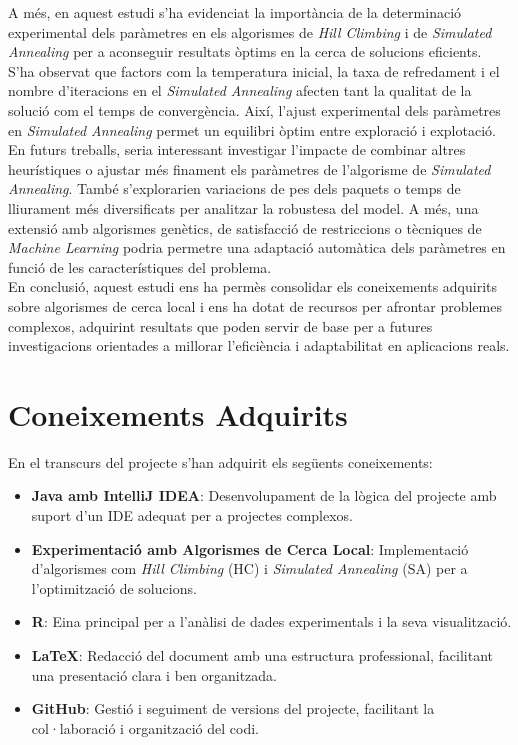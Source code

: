 \documentclass[a4paper]{article}
\begin{document}
	A més, en aquest estudi s'ha evidenciat la importància de la determinació experimental dels paràmetres en els algorismes de \textit{Hill Climbing} i de \textit{Simulated Annealing} per a aconseguir resultats òptims en la cerca de solucions eficients. S'ha observat que factors com la temperatura inicial, la taxa de refredament i el nombre d'iteracions en el \textit{Simulated Annealing} afecten tant la qualitat de la solució com el temps de convergència. Així, l'ajust experimental dels paràmetres en \textit{Simulated Annealing} permet un equilibri òptim entre exploració i explotació. \\
	
	En futurs treballs, seria interessant investigar l'impacte de combinar altres heurístiques o ajustar més finament els paràmetres de l'algorisme de \textit{Simulated Annealing}. També s'explorarien variacions de pes dels paquets o temps de lliurament més diversificats per analitzar la robustesa del model. A més, una extensió amb algorismes genètics, de satisfacció de restriccions o tècniques de \textit{Machine Learning} podria permetre una adaptació automàtica dels paràmetres en funció de les característiques del problema. \\
	
	En conclusió, aquest estudi ens ha permès consolidar els coneixements adquirits sobre algorismes de cerca local i ens ha dotat de recursos per afrontar problemes complexos, adquirint resultats que poden servir de base per a futures investigacions orientades a millorar l'eficiència i adaptabilitat en aplicacions reals. \\
	
	\section{Coneixements Adquirits}
	En el transcurs del projecte s'han adquirit els següents coneixements:
	
	\begin{itemize}
		\item \textbf{Java amb IntelliJ IDEA}: Desenvolupament de la lògica del projecte amb suport d'un IDE adequat per a projectes complexos.
		\item \textbf{Experimentació amb Algorismes de Cerca Local}: Implementació d'algorismes com \textit{Hill Climbing} (HC) i \textit{Simulated Annealing} (SA) per a l'optimització de solucions.
		\item \textbf{R}: Eina principal per a l'anàlisi de dades experimentals i la seva visualització.
		\item \textbf{\LaTeX}: Redacció del document amb una estructura professional, facilitant una presentació clara i ben organitzada.
		\item \textbf{GitHub}: Gestió i seguiment de versions del projecte, facilitant la col·laboració i organització del codi.
	\end{itemize}
	
\end{document}
